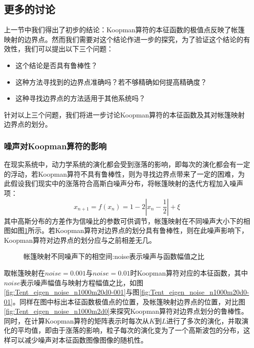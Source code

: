 \subsection{更多的讨论}
上一节中我们得出了初步的结论：Koopman算符的本征函数的极值点反映了帐篷映射的边界点。然而我们需要对这个结论作进一步的探究，为了验证这个结论的有效性，我们可以提出以下三个问题：
\begin{itemize}
\item 这个结论是否具有鲁棒性？
\item 这种方法寻找到的边界点准确吗？若不够精确如何提高精确度？
\item 这种寻找边界点的方法适用于其他系统吗？
\end{itemize}
针对以上三个问题，我们将进一步讨论Koopman算符的本征函数及其对帐篷映射边界点的划分。

\subsubsection{噪声对Koopman算符的影响}
在现实系统中，动力学系统的演化都会受到涨落的影响\cite{heninger2015neighborhoods}，即每次的演化都会有一定的浮动，若Koopman算符不具有鲁棒性，则为寻找边界点带来了一定的困难，为此假设我们现实中的涨落符合高斯白噪声分布，将帐篷映射的迭代方程加入噪声项：
\begin{equation}
  x_{n+1}=f(x_n)=1-2|x_n-\frac{1}{2}|+\xi
\end{equation}
其中高斯分布的方差作为信噪比的参数可供调节，帐篷映射在不同噪声大小下的相图如图\ref{fig:Tent_noise_phase_d0}所示。若Koopman算符对边界点的划分具有鲁棒性，则在此噪声影响下，Koopman算符对边界点的划分应与之前相差无几。

\begin{figure}[!]
  \centering
  \caption[帐篷映射不同噪声下的相空间]{帐篷映射不同噪声下的相空间:noise表示噪声与函数幅值之比}
  \label{fig:Tent_noise_phase_d0}
\end{figure}

取帐篷映射在$noise=0.001$与$noise=0.01$时Koopman算符对应的本征函数，其中$noise$表示噪声幅值与映射方程幅值之比，如图\ref{fig:Tent_eigen_noise_n1000m20d0-001}与图\ref{fig:Tent_eigen_noise_n1000m20d0-01}。同样在图中标出本征函数极值点的位置，及帐篷映射边界点的位置，对比图\ref{fig:Tent_eigen_noise_n1000m2d0}来探究Koopman算符对边界点划分的鲁棒性。同时，在计算Koopman算符的矩阵表示时每次从$K$到$L$进行了多次的演化，并取演化的平均值，即由于涨落的影响，粒子每次的演化变为了一个高斯波包的分布，这样可以减少噪声对本征函数图像图像的随机性。


